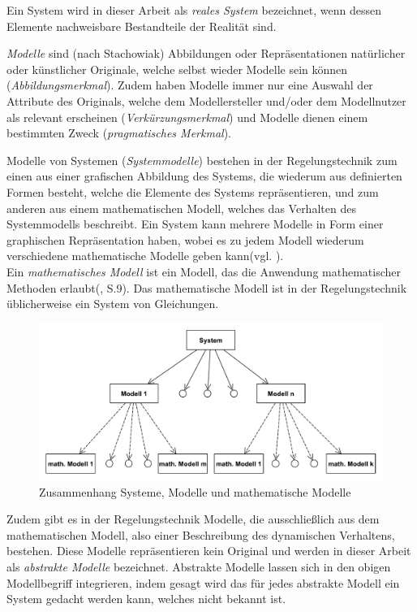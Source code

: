 Ein System wird in dieser Arbeit als \textit{reales System} bezeichnet, wenn dessen Elemente nachweisbare Bestandteile der Realität sind.

\textit{Modelle} sind (nach Stachowiak\cite[S. 13ff]{STA73}) Abbildungen oder Repräsentationen natürlicher oder künstlicher Originale, welche selbst wieder Modelle sein können (\textit{Abbildungsmerkmal}). Zudem haben Modelle immer nur eine Auswahl der Attribute des Originals, welche dem Modellersteller und/oder dem Modellnutzer als relevant erscheinen (\textit{Verkürzungsmerkmal}) und Modelle dienen einem bestimmten Zweck (\textit{pragmatisches Merkmal}). 

Modelle von Systemen (\textit{Systemmodelle}) bestehen in der Regelungstechnik zum einen aus einer grafischen Abbildung des Systems, die wiederum aus definierten Formen besteht, welche die Elemente des Systems repräsentieren, und zum anderen aus einem mathematischen Modell, welches das Verhalten des Systemmodells beschreibt. Ein System kann mehrere Modelle in Form einer graphischen Repräsentation haben, wobei es zu jedem Modell wiederum verschiedene mathematische Modelle geben kann(vgl. \cite[Abschnitt 2.1]{LUD95} ).\\
Ein \textit{mathematisches Modell} ist ein Modell, das die Anwendung mathematischer Methoden erlaubt(\cite{GRVO16}, S.9). Das mathematische Modell ist in der Regelungstechnik üblicherweise ein System von Gleichungen. 

\begin{figure}[H]
	\centering
	\includegraphics[width=0.9\linewidth]{Systeme_Modelle_Math_Beschreibung}
	\caption{Zusammenhang Systeme, Modelle und mathematische Modelle}
	\label{fig:SysModelleSkizze}
\end{figure}

Zudem gibt es in der Regelungstechnik Modelle, die ausschließlich aus dem mathematischen Modell, also einer Beschreibung des dynamischen Verhaltens, bestehen. Diese Modelle repräsentieren kein Original und werden in dieser Arbeit als \textit{abstrakte Modelle} bezeichnet. Abstrakte Modelle lassen sich in den obigen Modellbegriff integrieren, indem gesagt wird das für jedes abstrakte Modell ein System gedacht werden kann, welches nicht bekannt ist. 

